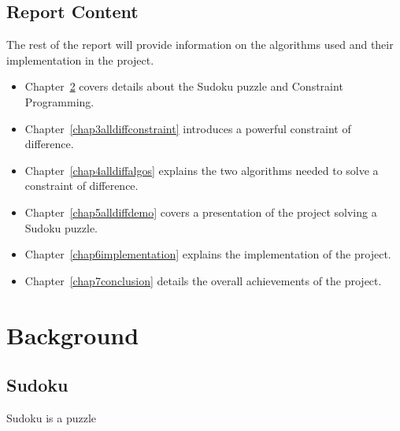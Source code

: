 \documentclass{l4proj}
\begin{document}
\section{Report Content}
The rest of the report will provide information on the algorithms used and their implementation in the project.
\begin{itemize}
\item Chapter~\ref{chap2background} covers details about the Sudoku puzzle and Constraint Programming.
\item Chapter~\ref{chap3alldiffconstraint} introduces a powerful constraint of difference.
\item Chapter~\ref{chap4alldiffalgos} explains the two algorithms needed to solve a constraint of difference.
\item Chapter~\ref{chap5alldiffdemo} covers a presentation of the project solving a Sudoku puzzle.
\item Chapter~\ref{chap6implementation} explains the implementation of the project.
\item Chapter~\ref{chap7conclusion} details the overall achievements of the project.
\end{itemize}

\chapter{Background}
\label{chap2background}
\section{Sudoku}
\noindent Sudoku is a puzzle
\end{document}
